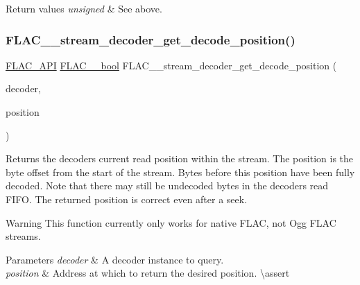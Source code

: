 \begin{DoxyRetVals}{Return values}
{\em unsigned} & See above. \\
\hline
\end{DoxyRetVals}
\mbox{\label{group__flac__stream__decoder_ga11507d25b6fdbd1efd5ee642923730fa}} 
\subsubsection{\texorpdfstring{FLAC\_\_stream\_decoder\_get\_decode\_position()}{FLAC\_\_stream\_decoder\_get\_decode\_position()}}
{\footnotesize\ttfamily \mbox{\hyperlink{group__flac__export_ga56ca07df8a23310707732b1c0007d6f5}{F\+L\+A\+C\+\_\+\+A\+PI}} \mbox{\hyperlink{ordinals_8h_a95103469f1cbd78b8cf250194985b34e}{F\+L\+A\+C\+\_\+\+\_\+bool}} F\+L\+A\+C\+\_\+\+\_\+stream\+\_\+decoder\+\_\+get\+\_\+decode\+\_\+position (\begin{DoxyParamCaption}\item[{const \mbox{\hyperlink{struct_f_l_a_c_____stream_decoder}{F\+L\+A\+C\+\_\+\+\_\+\+Stream\+Decoder}} $\ast$}]{decoder,  }\item[{\mbox{\hyperlink{ordinals_8h_aa78c8c70a3eb8a58af7436f278acde8e}{F\+L\+A\+C\+\_\+\+\_\+uint64}} $\ast$}]{position }\end{DoxyParamCaption})}

Returns the decoder\textquotesingle{}s current read position within the stream. The position is the byte offset from the start of the stream. Bytes before this position have been fully decoded. Note that there may still be undecoded bytes in the decoder\textquotesingle{}s read F\+I\+FO. The returned position is correct even after a seek.

\begin{DoxyWarning}{Warning}
This function currently only works for native F\+L\+AC, not Ogg F\+L\+AC streams.
\end{DoxyWarning}

\begin{DoxyParams}{Parameters}
{\em decoder} & A decoder instance to query. \\
\hline
{\em position} & Address at which to return the desired position. \textbackslash{}assert 
\begin{DoxyCode}{1}
\end{DoxyCode}
 
\begin{DoxyCode}{1}
\end{DoxyCode}
 \\
\hline
\end{DoxyParams}

